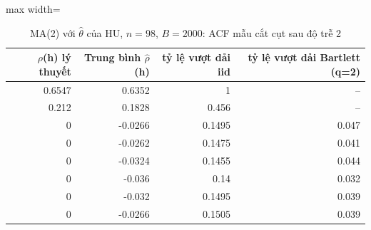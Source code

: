 \begin{table}[H]
\centering\small
\caption{MA(2) với $\hat\theta$ của HU, $n=98$, $B=2000$: ACF mẫu cắt cụt sau độ trễ 2}\label{tab:tab_b11_09_ma2_simulation}
\begin{adjustbox}{max width=\linewidth}
\begin{tabular}{rrrr}
\toprule
$\rho$(h) lý thuyết & Trung bình $\hat{\rho}$(h) & tỷ lệ vượt dải iid & tỷ lệ vượt dải Bartlett (q=2) \\
\midrule
0.6547 & 0.6352 & 1 & – \\
0.212 & 0.1828 & 0.456 & – \\
0 & -0.0266 & 0.1495 & 0.047 \\
0 & -0.0262 & 0.1475 & 0.041 \\
0 & -0.0324 & 0.1455 & 0.044 \\
0 & -0.036 & 0.14 & 0.032 \\
0 & -0.032 & 0.1495 & 0.039 \\
0 & -0.0266 & 0.1505 & 0.039 \\
\bottomrule
\end{tabular}
\end{adjustbox}\par{}
\end{table}
